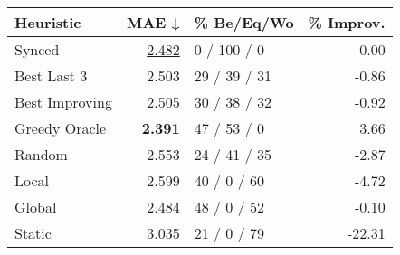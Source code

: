 \begin{tabular}{lrlr}
\toprule
\textbf{Heuristic} & \textbf{MAE ↓} & \textbf{\% Be/Eq/Wo} & \textbf{\% Improv.} \\
\midrule
            Synced &          \underline{2.482} &          0 / 100 / 0 &                0.00 \\
\midrule
       Best Last 3 &          2.503 &         29 / 39 / 31 &               -0.86 \\
    Best Improving &          2.505 &         30 / 38 / 32 &               -0.92 \\
\addlinespace
     Greedy Oracle &          \textbf{2.391} &          47 / 53 / 0 &                3.66 \\
            Random &          2.553 &         24 / 41 / 35 &               -2.87 \\
\midrule
             Local &          2.599 &          40 / 0 / 60 &               -4.72 \\
            Global &          2.484 &          48 / 0 / 52 &               -0.10 \\
\midrule
            Static &          3.035 &          21 / 0 / 79 &              -22.31 \\
\bottomrule
\end{tabular}

\label{tab:hr_iid_lr05_le2_bs2_Summary}
